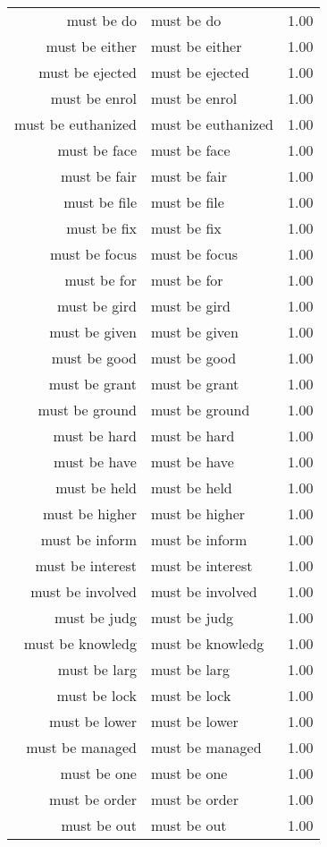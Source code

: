 \begin{table}[ht]
\begin{tabular}{rlr}
  must be do & must be do & 1.00 \\ 
  must be either & must be either & 1.00 \\ 
  must be ejected & must be ejected & 1.00 \\ 
  must be enrol & must be enrol & 1.00 \\ 
  must be euthanized & must be euthanized & 1.00 \\ 
  must be face & must be face & 1.00 \\ 
  must be fair & must be fair & 1.00 \\ 
  must be file & must be file & 1.00 \\ 
  must be fix & must be fix & 1.00 \\ 
  must be focus & must be focus & 1.00 \\ 
  must be for & must be for & 1.00 \\ 
  must be gird & must be gird & 1.00 \\ 
  must be given & must be given & 1.00 \\ 
  must be good & must be good & 1.00 \\ 
  must be grant & must be grant & 1.00 \\ 
  must be ground & must be ground & 1.00 \\ 
  must be hard & must be hard & 1.00 \\ 
  must be have & must be have & 1.00 \\ 
  must be held & must be held & 1.00 \\ 
  must be higher & must be higher & 1.00 \\ 
  must be inform & must be inform & 1.00 \\ 
  must be interest & must be interest & 1.00 \\ 
  must be involved & must be involved & 1.00 \\ 
  must be judg & must be judg & 1.00 \\ 
  must be knowledg & must be knowledg & 1.00 \\ 
  must be larg & must be larg & 1.00 \\ 
  must be lock & must be lock & 1.00 \\ 
  must be lower & must be lower & 1.00 \\ 
  must be managed & must be managed & 1.00 \\ 
  must be one & must be one & 1.00 \\ 
  must be order & must be order & 1.00 \\ 
  must be out & must be out & 1.00 \\ 

\end{tabular}
\end{table}
